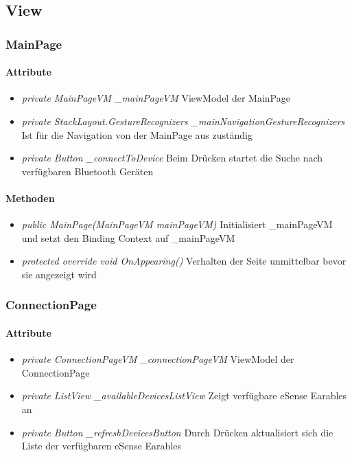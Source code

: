 \documentclass[../entwurf.tex]{subfiles}
\begin{document}
\newcommand{\attr}[1]{\item \textit{#1}}

\subsection{View}
\subsubsection{MainPage}

\paragraph{Attribute}

\begin{itemize}
	\attr{private MainPageVM \_mainPageVM} ViewModel der MainPage
	\attr{private StackLayout.GestureRecognizers \_mainNavigationGestureRecognizers} Ist für die Navigation von der MainPage aus zuständig
	\attr{private Button \_connectToDevice} Beim Drücken startet die Suche nach verfügbaren Bluetooth Geräten
\end{itemize}

\paragraph{Methoden}
\begin{itemize}
	\attr{public MainPage(MainPageVM mainPageVM)} Initialisiert \_mainPageVM und setzt den Binding Context 			auf \_mainPageVM  
	\attr{protected override void OnAppearing()} Verhalten der Seite unmittelbar bevor sie angezeigt wird
\end{itemize}

\subsubsection{ConnectionPage}

\paragraph{Attribute}
\begin{itemize}
	\attr{private ConnectionPageVM \_connectionPageVM} ViewModel der ConnectionPage
	\attr{private ListView \_availableDevicesListView} Zeigt verfügbare eSense Earables an
	\attr{private Button \_refreshDevicesButton} Durch Drücken aktualisiert sich die Liste der verfügbaren eSense Earables
\end{itemize}
\end{document}
